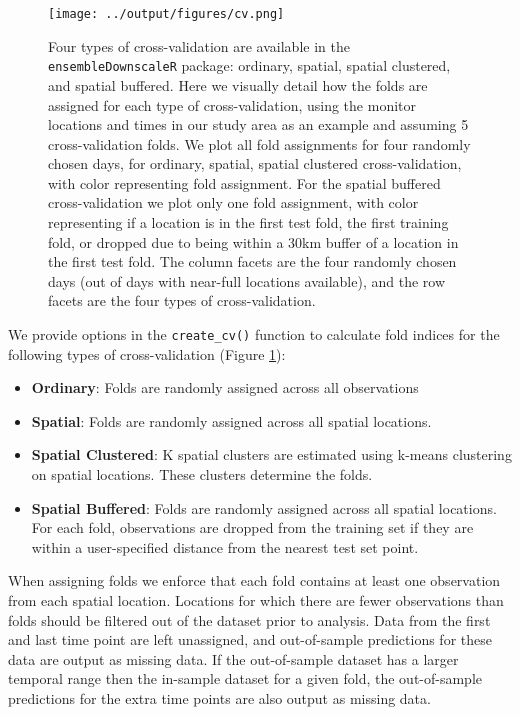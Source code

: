 \documentclass[12pt]{article}
\begin{document}
\begin{figure}[ht]
    \centering
    \texttt{[image: ../output/figures/cv.png]}
    \caption{Four types of cross-validation are available in the \texttt{ensembleDownscaleR} package: ordinary, spatial, spatial clustered, and spatial buffered.
    Here we visually detail how the folds are assigned for each type of cross-validation, using the monitor locations and times in our study area as an example and assuming 5 cross-validation folds. 
    We plot all fold assignments for four randomly chosen days, for ordinary, spatial, spatial clustered cross-validation, with color representing fold assignment.
    For the spatial buffered cross-validation we plot only one fold assignment, with color representing if a location is in the first test fold, the first training fold, or dropped due to being within a 30km buffer of a location in the first test fold.
    The column facets are the four randomly chosen days (out of days with near-full locations available), and the row facets are the four types of cross-validation.}
    \label{fig:cvtypes}
\end{figure}

We provide options in the \texttt{create\_cv()} function to calculate fold indices for the following types of cross-validation (Figure \ref{fig:cvtypes}):

\begin{itemize}
  \item \textbf{Ordinary}: Folds are randomly assigned across all observations
  \item \textbf{Spatial}: Folds are randomly assigned across all spatial locations. 
  \item \textbf{Spatial Clustered}: K spatial clusters are estimated using k-means clustering on spatial locations. These clusters determine the folds. 
  \item \textbf{Spatial Buffered}: Folds are randomly assigned across all spatial locations. For each fold, observations are dropped from the training set if they are within a user-specified distance from the nearest test set point. 
\end{itemize}

When assigning folds we enforce that each fold contains at least one observation from each spatial location.
Locations for which there are fewer observations than folds should be filtered out of the dataset prior to analysis.
Data from the first and last time point are left unassigned, and out-of-sample predictions for these data are output as missing data.
If the out-of-sample dataset has a larger temporal range then the in-sample dataset for a given fold, the out-of-sample predictions for the extra time points are also output as missing data.
\end{document}

